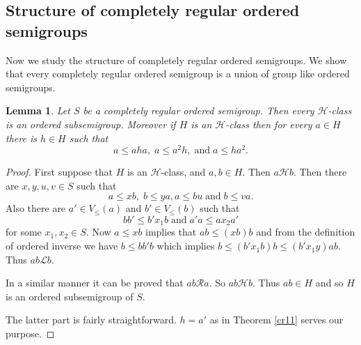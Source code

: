 \documentclass[13pt]{article}
\newtheorem{Lemma}[theorem]{Lemma}
\theoremstyle{definition}
\theoremstyle{remark}
\numberwithin{equation}{section}
\newcommand{\lc}{\mathcal{L}}
\newcommand{\rc}{\mathcal{R}}
\newcommand{\hc}{\mathcal{H}}
\begin{document}
\subsection{Structure of completely regular ordered semigroups}
Now we study the structure of completely regular ordered semigroups.
We show that every completely regular ordered semigroup is a union
of group like ordered semigroups.
\begin{Lemma}\label{cr12}
Let $S$ be a completely regular ordered semigroup. Then every
$\hc$-class  is an ordered  subsemigroup. Moreover   if  $H$ is  an
$\hc$-class then for every  $a \in H$  there is $h \in H$ such that
$$ a\leq aha, \;a \leq a^2h, \;\textrm{and} \;a \leq ha^2.$$
\end{Lemma}
\begin{proof}
First suppose that   $H$ is  an $\hc$-class, and $a, b \in H$. Then
$a \hc b$. Then  there are $x, y, u, v \in S$ such that $$a \leq xb,
\; b \leq ya, a \leq bu \;\textrm{and} \;b \leq va.$$ Also there are
$a' \in V_{\leq}(a)$ and $b' \in V_{\leq}(b)$ such that
$$bb' \leq b'x_1 b \;\textrm{and} \;a'a \leq ax_2a'$$ for some $x_1, x_2 \in
S$. Now $a \leq xb$ implies that $ab \leq (xb)b$ and from the
definition of ordered inverse we have  $b \leq bb'b$ which implies
$b \leq (b'x_1 b) b \leq (b' x_1y)ab$.  Thus $ab \lc b$.

In a similar manner it can be proved  that $ab \rc a$. So $ab \hc
b$. Thus $ab \in H$ and so  $H$ is an ordered subsemigroup of $S$.

The latter part is fairly straightforward.  $h = a'$ as in Theorem
\ref{cr11} serves our purpose.
\end{proof}
\end{document}
